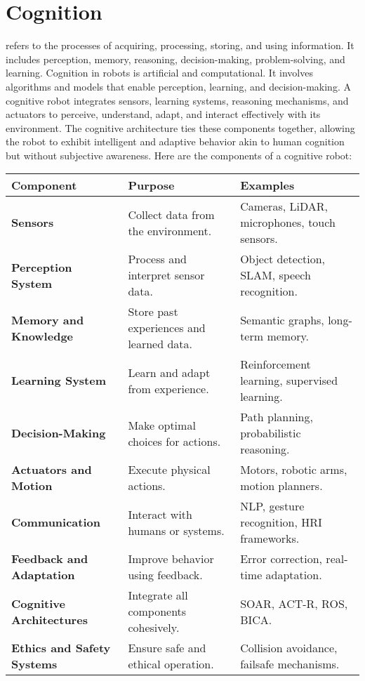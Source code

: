 \section{Cognition} 
refers to the processes of acquiring, processing, storing, and using information. It includes perception, memory, reasoning, decision-making, problem-solving, and learning. Cognition in robots is artificial and computational. It involves algorithms and models that enable perception, learning, and decision-making. A cognitive robot integrates sensors, learning systems, reasoning mechanisms, and actuators to perceive, understand, adapt, and interact effectively with its environment. The cognitive architecture ties these components together, allowing the robot to exhibit intelligent and adaptive behavior akin to human cognition but without subjective awareness. Here are the components of a cognitive robot:
    \begin{tabular}{|l|l|l|}
        \hline
        \textbf{Component} & \textbf{Purpose} & \textbf{Examples} \\ \hline
        \textbf{Sensors} & Collect data from the environment. & Cameras, LiDAR, microphones, touch sensors. \\ \hline
        \textbf{Perception System} & Process and interpret sensor data. & Object detection, SLAM, speech recognition. \\ \hline
        \textbf{Memory and Knowledge} & Store past experiences and learned data. & Semantic graphs, long-term memory. \\ \hline
        \textbf{Learning System} & Learn and adapt from experience. & Reinforcement learning, supervised learning. \\ \hline
        \textbf{Decision-Making} & Make optimal choices for actions. & Path planning, probabilistic reasoning. \\ \hline
        \textbf{Actuators and Motion} & Execute physical actions. & Motors, robotic arms, motion planners. \\ \hline
        \textbf{Communication} & Interact with humans or systems. & NLP, gesture recognition, HRI frameworks. \\ \hline
        \textbf{Feedback and Adaptation} & Improve behavior using feedback. & Error correction, real-time adaptation. \\ \hline
        \textbf{Cognitive Architectures} & Integrate all components cohesively. & SOAR, ACT-R, ROS, BICA. \\ \hline
        \textbf{Ethics and Safety Systems} & Ensure safe and ethical operation. & Collision avoidance, failsafe mechanisms. \\ \hline
    \end{tabular}
        
